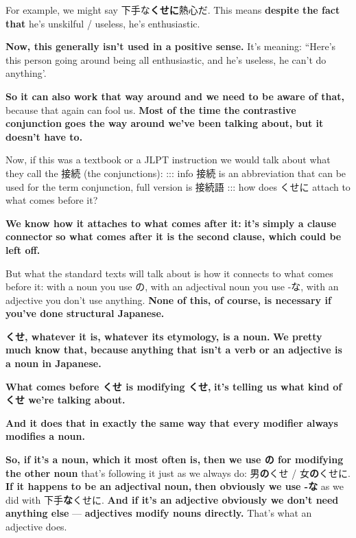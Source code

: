 For example, we might say 下手な{\bf くせに}熱心だ. This means {\bf despite the fact that} he's unskilful / useless, he's enthusiastic.

{}

{\bf Now, this generally isn't used in a positive sense.} It's meaning:\crlf
“Here's this person going around being all enthusiastic, and he's useless, he can't do anything'.

\thinrule

{\bf So it can also work that way around and we need to be aware of that,} because that again can fool us. {\bf Most of the time the contrastive conjunction} {\bf goes the way around we've been talking about,} {\bf but it doesn't have to.}

\thinrule

Now, if this was a textbook or a JLPT instruction we would talk about what they call the 接続 (the conjunctions): ::: info 接続 is an abbreviation that can be used for the term conjunction, full version is 接続語 ::: how does くせに attach to what comes before it?

{}

{\bf We know how it attaches to what comes after it:} {\bf it's simply a clause connector} {\bf so what comes after it is the second clause, which could be left off.}

But what the standard texts will talk about is how it connects to what comes before it: with a noun you use の, with an adjectival noun you use -な, with an adjective you don't use anything. {\bf None of this, of course, is necessary if you've done structural Japanese.}

\thinrule

{\bf くせ, whatever it is, whatever its etymology, is a noun.} {\bf We pretty much know that, because} {\bf anything that isn't a verb or an adjective is a noun in Japanese.}

{}

{\bf What comes before くせ is modifying くせ,} {\bf it's telling us what kind of くせ we're talking about.}

\thinrule

{\bf And it does that in exactly the same way that every modifier always modifies a noun.}

{}

{\bf So, if it's a noun, which it most often is,} {\bf then we use の for modifying the other noun} that's following it just as we always do: 男{\bf の}くせ / 女{\bf の}くせに. {\bf If it happens to be an adjectival noun,} {\bf then obviously we use -な} as we did with 下手{\bf な}くせに. {\bf And if it's an adjective obviously we don't need anything else} --- {\bf adjectives modify nouns directly.} That's what an adjective does.

